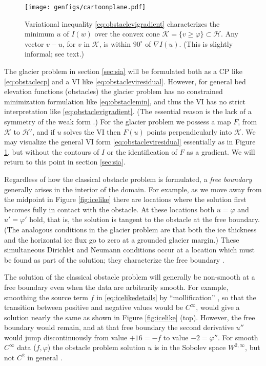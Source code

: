 \documentclass[letterpaper,final,12pt,reqno]{amsart}
\theoremstyle{claim}
\newcommand{\grad}{\nabla}
\numberwithin{equation}{section}
\numberwithin{figure}{section}
\numberwithin{table}{section}
\numberwithin{theorem}{section}
\begin{document}
\begin{figure}
\texttt{[image: genfigs/cartoonplane.pdf]}
\caption{Variational inequality \eqref{eq:obstaclevigradient} characterizes the minimum $u$ of $I(w)$ over the convex cone $\mathcal{K}=\{v\ge \varphi\} \subset \mathcal{H}$.  Any vector $v-u$, for $v$ in $\mathcal{K}$, is within $90^\circ$ of $\grad I(u)$.  (This is slightly informal; see text.)}
\label{fig:cartoonplane}
\end{figure}

The glacier problem in section \ref{sec:sia} will be formulated both as a CP like \eqref{eq:obstaclecp} and a VI like \eqref{eq:obstacleviresidual}.  However, for general bed elevation functions (obstacles) the glacier problem has no constrained minimization formulation like \eqref{eq:obstaclemin}, and thus the VI has no strict interpretation like \eqref{eq:obstaclevigradient}.  (The essential reason is the lack of a symmetry of the weak form \cite{JouvetBueler2012}.)  For the glacier problem we possess a map $F$, from $\mathcal{K}$ to $\mathcal{H}'$, and if $u$ solves the VI then $F(u)$ points perpendicularly into $\mathcal{K}$.  We may visualize the general VI form \eqref{eq:obstacleviresidual} essentially as in Figure \ref{fig:cartoonplane}, but without the contours of $I$ or the identification of $F$ as a gradient.  We will return to this point in section \ref{sec:sia}.

Regardless of how the classical obstacle problem is formulated, a \emph{free boundary} generally arises in the interior of the domain.  For example, as we move away from the midpoint in Figure \ref{fig:icelike} there are locations where the solution first becomes fully in contact with the obstacle.  At these locations both $u=\varphi$ and $u'=\varphi'$ hold, that is, the solution is tangent to the obstacle at the free boundary.  (The analogous conditions in the glacier problem are that both the ice thickness and the horizontal ice flux go to zero at a grounded glacier margin.)  These simultaneous Dirichlet and Neumann conditions occur at a location which must be found as part of the solution; they characterize the free boundary \cite[Chapter V]{KinderlehrerStampacchia1980}.

The solution of the classical obstacle problem will generally be non-smooth at a free boundary even when the data are arbitrarily smooth.  For example, smoothing the source term $f$ in \eqref{eq:icelikedetails} by ``mollification'' \cite{Evans2010}, so that the transition between positive and negative values would be $C^\infty$, would give a solution nearly the same as shown in Figure \ref{fig:icelike} (top).  However, the free boundary would remain, and at that free boundary the second derivative $u''$ would jump discontinuously from value $+16=-f$ to value $-2=\varphi''$.  For smooth $C^\infty$ data ($f,\varphi$) the obstacle problem solution $u$ is in the Sobolev space $W^{2,\infty}$, but not $C^2$ in general \cite[section IV.6]{KinderlehrerStampacchia1980}.
\end{document}
